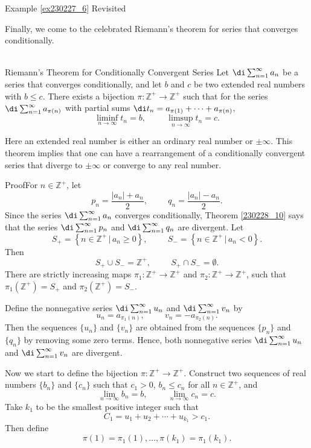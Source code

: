 \begin{example}{\linkt Example \ref{ex230227_6} Revisited}
\begin{example}[label=ex230227_13]{}
Finally, we come to the celebrated Riemann's theorem for series that converges conditionally.
\begin{theorem}{\\Riemann's Theorem for Conditionally Convergent Series}
Let $\di\sum_{n=1}^{\infty}a_n$ be a series that converges conditionally, and let $b$ and $c$ be two extended real numbers with $b\leq c$. There exists a bijection $\pi:\mathbb{Z}^+\to\mathbb{Z}^+$ such that for the series $\di\sum_{n=1}^{\infty}a_{\pi(n)}$ with partial sums $\di t_n=a_{\pi(1)}+\cdots+a_{\pi(n)}$,
\[\liminf_{n\to\infty}t_n=b,\hspace{1cm}\limsup_{n\to\infty}t_n=c.\]\end{theorem} 
Here an extended real number is either an ordinary real number or $\pm\infty$. This theorem implies that one can have a rearrangement of a conditionally convergent series that diverge to $\pm\infty$ or converge to any real number.
\begin{myproof}{Proof}For $n\in\mathbb{Z}^+$, let
\[p_n=\frac{|a_n|+a_n}{2},\hspace{1cm}q_n=\frac{|a_n|-a_n}{2}.\]
Since  the series $\di\sum_{n=1}^{\infty}a_n$   converges conditionally, Theorem \ref{230228_10} says that the series  $\di\sum_{n=1}^{\infty}p_n$ and $\di\sum_{n=1}^{\infty}q_n$  are divergent. 
Let
\[S_+=\left\{n\in\mathbb{Z}^+\,|\, a_n\geq 0\right\}, \hspace{1cm}S_-=\left\{n\in\mathbb{Z}^+\,|\, a_n< 0\right\}.\] 
Then \[S_+\cup S_-=\mathbb{Z}^+,\hspace{1cm}S_+\cap S_-=\emptyset.\]
There are strictly increasing maps $\pi_1:\mathbb{Z}^+\to\mathbb{Z}^+$ and $\pi_2:\mathbb{Z}^+\to\mathbb{Z}^+$, such that $\pi_1(\mathbb{Z}^+)=S_+$ and $\pi_2(\mathbb{Z}^+)=S_-$.

Define the nonnegative series $\di\sum_{n=1}^{\infty}u_n$ and $\di\sum_{n=1}^{\infty}v_n$ by 
\[u_n=a_{\pi_1(n)},\hspace{1cm}v_n=-a_{\pi_2(n)}.\]\bp
Then  the sequences  $\{u_n\}$ and $\{v_n\}$ are obtained from the sequences $\{p_n\}$ and $\{q_n\}$ by removing some zero terms. 
 Hence, both nonnegative series $\di\sum_{n=1}^{\infty}u_n$ and $\di\sum_{n=1}^{\infty}v_n$ are divergent.

Now we start to define the bijection $\pi:\mathbb{Z}^+\to\mathbb{Z}^+$.  
 Construct two sequences of real numbers $\{b_n\}$ and $\{c_n\}$ such that  $c_1>0$, $b_n\leq c_n$ for all $n\in\mathbb{Z}^+$, and 
\[\lim_{n\to \infty}b_n=b,\hspace{1cm}\lim_{n\to \infty}c_n=c.\]
Take $k_1$ to be the smallest positive integer such that
\[C_1=u_1+u_2+\cdots+u_{k_1}>c_1.\]
Then define
\[\pi(1)=\pi_1(1),\ldots,\pi(k_1)=\pi_1(k_1).\]


\end{myproof}
\end{example}
\end{example}
